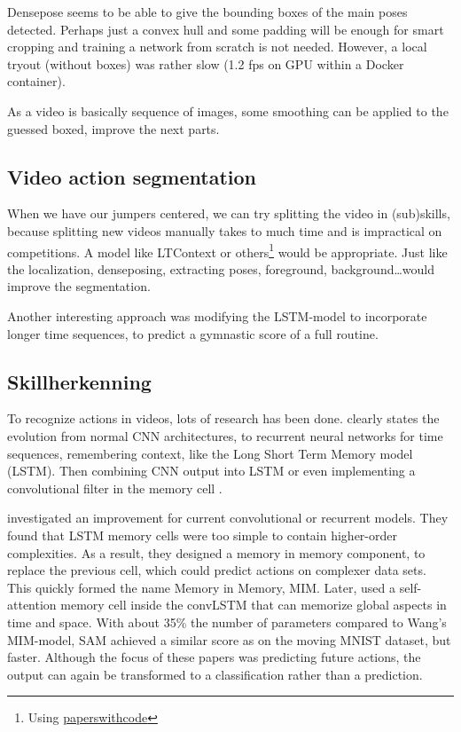 Densepose seems to be able to give the bounding boxes of the main poses detected. Perhaps just a convex hull and some padding will be enough for smart cropping and training a network from scratch is not needed. However, a local tryout (without boxes) was rather slow (1.2 fps on GPU within a Docker container).

As a video is basically sequence of images, some smoothing can be applied to the guessed boxed, improve the next parts.

\subsection{Video action segmentation}

When we have our jumpers centered, we can try splitting the video in (sub)skills, because splitting new videos manually takes to much time and is impractical on competitions.
A model like LTContext \textcite{Jiaming_2023} or others\footnote{Using \href{https://paperswithcode.com/task/action-segmentation}{paperswithcode}} would be appropriate. 
Just like the localization, denseposing, extracting poses, foreground, background\dots would improve the segmentation.

Another interesting approach was \textcite{Zahan_2023} modifying the LSTM-model to incorporate longer time sequences, to predict a gymnastic score of a full routine.

\subsection{Skillherkenning}
\label{subsec:skillherkenning}

To recognize actions in videos, lots of research has been done. %
\textcite{Yin_2024} clearly states the evolution from normal CNN architectures, to recurrent neural networks for time sequences, remembering context, like the Long Short Term Memory model (LSTM). Then combining CNN output into LSTM or even implementing a convolutional filter in the memory cell \autocite{Shi_2015}.

\textcite{Wang_2019} investigated an improvement for current convolutional or recurrent models. They found that LSTM memory cells were too simple to contain higher-order complexities. As a result, they designed a memory in memory component, to replace the previous cell, which could predict actions on complexer data sets. This quickly formed the name Memory in Memory, MIM. Later, \textcite{Lin_2020} used
a self-attention memory cell inside the convLSTM that can memorize global aspects in time and space. With about 35\% the number of parameters compared to Wang's MIM-model, SAM achieved a similar score as on the moving MNIST dataset, but faster. Although the focus of these papers was predicting future actions, the output can again be transformed to a classification rather than a prediction.


